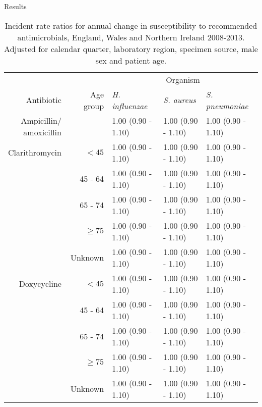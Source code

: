 \documentclass[final, 14pt]{beamer}
\begin{document}
\begin{frame}
\begin{columns}[t]
\begin{minipage}[T]{.95\textwidth}
\begin{block}{Results}
\begin{table}
   \centering
   \small%
   \begin{tabular}{rrlll}
  \hline
 &  & \multicolumn{3}{c}{Organism}\\
  \cline{3-5}
Antibiotic & Age group & \textit{H. influenzae} & \textit{S. aureus} & \textit{S. pneumoniae}\\
\midrule
\shortstack{Ampicillin/\\amoxicillin} & & 1.00 (0.90 - 1.10) & 1.00 (0.90 - 1.10) & 1.00 (0.90 - 1.10)\\
Clarithromycin & $<45$ & 1.00 (0.90 - 1.10) & 1.00 (0.90 - 1.10) & 1.00 (0.90 - 1.10)\\
 & 45 - 64 & 1.00 (0.90 - 1.10) & 1.00 (0.90 - 1.10) & 1.00 (0.90 - 1.10)\\
 & 65 - 74 & 1.00 (0.90 - 1.10) & 1.00 (0.90 - 1.10) & 1.00 (0.90 - 1.10)\\
 & $\geq 75$ & 1.00 (0.90 - 1.10) & 1.00 (0.90 - 1.10) & 1.00 (0.90 - 1.10)\\
 & Unknown & 1.00 (0.90 - 1.10) & 1.00 (0.90 - 1.10) & 1.00 (0.90 - 1.10)\\
Doxycycline & $<45$ & 1.00 (0.90 - 1.10) & 1.00 (0.90 - 1.10) & 1.00 (0.90 - 1.10)\\
 & 45 - 64 & 1.00 (0.90 - 1.10) & 1.00 (0.90 - 1.10) & 1.00 (0.90 - 1.10)\\
 & 65 - 74 & 1.00 (0.90 - 1.10) & 1.00 (0.90 - 1.10) & 1.00 (0.90 - 1.10)\\
 & $\geq 75$ & 1.00 (0.90 - 1.10) & 1.00 (0.90 - 1.10) & 1.00 (0.90 - 1.10)\\
 & Unknown & 1.00 (0.90 - 1.10) & 1.00 (0.90 - 1.10) & 1.00 (0.90 - 1.10)\\
\bottomrule  
\end{tabular}
   \caption{Incident rate ratios for annual change in susceptibility to recommended antimicrobials, England, Wales and Northern Ireland 2008-2013.
   Adjusted for calendar quarter, laboratory region, specimen source, male sex and patient age.}
   \label{tab:table1}
   \end{table} 
      \vspace{1 cm}


\end{block}
\end{minipage}
\end{columns}
\end{frame}
\end{document}

